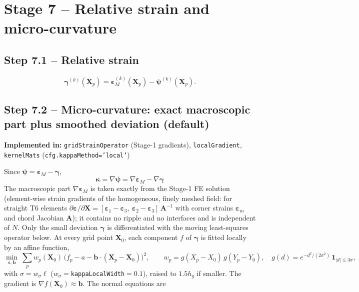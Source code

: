 \documentclass[11pt,a4paper]{article}
\newcommand{\eps}{\bm{\varepsilon}}
\newcommand{\epsM}{\bm{\varepsilon}_{M}}
\newcommand{\bpsi}{\bm{\psi}}
\newcommand{\bgam}{\bm{\gamma}}
\newcommand{\bkap}{\bm{\kappa}}
\newcommand{\bX}{\bm{X}}
\newcommand{\code}[1]{\texttt{#1}}
\theoremstyle{plain}
\theoremstyle{remark}
\newcommand{\implementedin}[1]{\begin{codebox}\textbf{Implemented in:} #1\end{codebox}}
\begin{document}
\section{Stage 7 -- Relative strain and micro-curvature}
\label{sec:stage7}

\subsection*{Step 7.1 -- Relative strain}
\begin{equation}
  \bgam^{(k)}(\bX_p)=\epsM^{(k)}(\bX_p)-\bpsi^{(k)}(\bX_p) .
\end{equation}

\subsection*{Step 7.2 -- Micro-curvature: exact macroscopic part plus smoothed deviation (default)}
\implementedin{\code{gridStrainOperator} (Stage-1 gradients), \code{localGradient}, \code{kernelMats} (\code{cfg.kappaMethod='local'})}
Since $\bpsi=\epsM-\bgam$,
\begin{equation}
  \boxed{\;\bkap=\nabla\bpsi=\nabla\epsM-\nabla\bgam\;}
  \label{eq:kapsplit}
\end{equation}
The macroscopic part $\nabla\epsM$ is taken exactly from the Stage-1 FE solution (element-wise
strain gradients of the homogeneous, finely meshed field: for straight T6 elements
$\partial\eps/\partial\bX=[\eps_1-\eps_3,\ \eps_2-\eps_3]\,\bm A^{-1}$ with corner strains $\eps_m$
and chord Jacobian $\bm A$); it contains no ripple and no interfaces and is independent of $N$.
Only the small deviation $\bgam$ is differentiated with the moving least-squares operator below.
At every grid point $\bX_0$, each component $f$ of $\bgam$ is fitted locally by an affine function,
\begin{equation}
  \min_{a,\bm b}\ \sum_p w_p(\bX_0)\,\big(f_p-a-\bm b\cdot(\bX_p-\bX_0)\big)^2,\qquad
  w_p=g(X_p-X_0)\,g(Y_p-Y_0),\quad
  g(d)=e^{-d^2/(2\sigma^2)}\,\mathbf 1_{|d|\le3\sigma},
  \label{eq:mls}
\end{equation}
with $\sigma=w_\sigma\ell$ ($w_\sigma=$\code{kappaLocalWidth}$=0.1$), raised to $1.5h_g$ if smaller.
The gradient is $\nabla f(\bX_0)\approx\bm b$. The normal equations are
\end{document}
